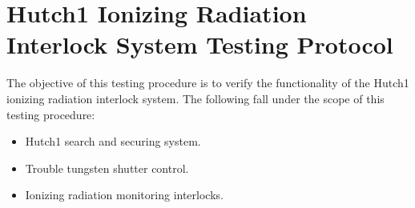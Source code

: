\documentclass[letterpaper,10pt,english]{sphinxmanual}
\begin{document}
\sphinxstepscope


\section{Hutch\sphinxhyphen{}1 Ionizing Radiation Interlock System Testing Protocol}
\label{\detokenize{testing_documentation/Hutch-1_ionizing_radiation:hutch-1-ionizing-radiation-interlock-system-testing-protocol}}\label{\detokenize{testing_documentation/Hutch-1_ionizing_radiation::doc}}
\sphinxAtStartPar
The objective of this testing procedure is to verify the functionality of the Hutch\sphinxhyphen{}1 ionizing radiation interlock system.
The following fall under the scope of this testing procedure:
\begin{itemize}
\item {} 
\sphinxAtStartPar
Hutch\sphinxhyphen{}1 search and securing system.

\item {} 
\sphinxAtStartPar
Trouble tungsten shutter control.

\item {} 
\sphinxAtStartPar
Ionizing radiation monitoring interlocks.

\end{itemize}
\end{document}

